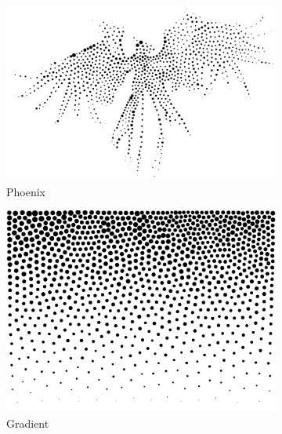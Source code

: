 \documentclass[11pt]{article}
\begin{document}
\begin{enumerate}
\begin{figure}[H]
    \centering
        \begin{subfigure}{0.3\textwidth}
        \centering
        \includegraphics[width=\textwidth]{../results/voronoi/4-1.pdf}
 \caption{Phoenix}
    \end{subfigure}
    \begin{subfigure}{0.3\textwidth}
        \centering
        \includegraphics[width=\textwidth]{../results/voronoi/4-2.pdf}
 \caption{Gradient}
    \end{subfigure}
    \begin{subfigure}{0.3\textwidth}
        \centering

\end{subfigure}
\end{figure}
\end{enumerate}
\end{document}
